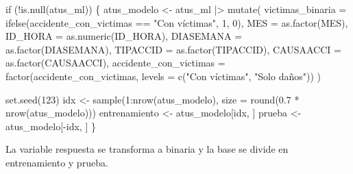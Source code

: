 \documentclass[
  spanish,
  10.5pt,
  letterpaper,
  openany,
  headings=big]{scrbook}
\newenvironment{Shaded}{}{}
\newcommand{\AttributeTok}[1]{\textcolor[rgb]{0.84,0.23,0.29}{#1}}
\newcommand{\ControlFlowTok}[1]{\textcolor[rgb]{0.84,0.23,0.29}{#1}}
\newcommand{\DecValTok}[1]{\textcolor[rgb]{0.00,0.36,0.77}{#1}}
\newcommand{\FloatTok}[1]{\textcolor[rgb]{0.00,0.36,0.77}{#1}}
\newcommand{\FunctionTok}[1]{\textcolor[rgb]{0.44,0.26,0.76}{#1}}
\newcommand{\NormalTok}[1]{\textcolor[rgb]{0.14,0.16,0.18}{#1}}
\newcommand{\OtherTok}[1]{\textcolor[rgb]{0.44,0.26,0.76}{#1}}
\newcommand{\SpecialCharTok}[1]{\textcolor[rgb]{0.00,0.36,0.77}{#1}}
\newcommand{\StringTok}[1]{\textcolor[rgb]{0.01,0.18,0.38}{#1}}
\begin{document}
\begin{Shaded}
\begin{Highlighting}[]
\ControlFlowTok{if}\NormalTok{ (}\SpecialCharTok{!}\FunctionTok{is.null}\NormalTok{(atus\_ml)) \{}
\NormalTok{  atus\_modelo }\OtherTok{\textless{}{-}}\NormalTok{ atus\_ml }\SpecialCharTok{|\textgreater{}}
    \FunctionTok{mutate}\NormalTok{(}
      \AttributeTok{victimas\_binaria =} \FunctionTok{ifelse}\NormalTok{(accidente\_con\_victimas }\SpecialCharTok{==} \StringTok{"Con víctimas"}\NormalTok{, }\DecValTok{1}\NormalTok{, }\DecValTok{0}\NormalTok{),}
      \AttributeTok{MES =} \FunctionTok{as.factor}\NormalTok{(MES),}
      \AttributeTok{ID\_HORA =} \FunctionTok{as.numeric}\NormalTok{(ID\_HORA),}
      \AttributeTok{DIASEMANA =} \FunctionTok{as.factor}\NormalTok{(DIASEMANA),}
      \AttributeTok{TIPACCID =} \FunctionTok{as.factor}\NormalTok{(TIPACCID),}
      \AttributeTok{CAUSAACCI =} \FunctionTok{as.factor}\NormalTok{(CAUSAACCI),}
      \AttributeTok{accidente\_con\_victimas =} \FunctionTok{factor}\NormalTok{(accidente\_con\_victimas, }\AttributeTok{levels =} \FunctionTok{c}\NormalTok{(}\StringTok{"Con víctimas"}\NormalTok{, }\StringTok{"Solo daños"}\NormalTok{))}
\NormalTok{    )}

  \FunctionTok{set.seed}\NormalTok{(}\DecValTok{123}\NormalTok{)}
\NormalTok{  idx }\OtherTok{\textless{}{-}} \FunctionTok{sample}\NormalTok{(}\DecValTok{1}\SpecialCharTok{:}\FunctionTok{nrow}\NormalTok{(atus\_modelo), }\AttributeTok{size =} \FunctionTok{round}\NormalTok{(}\FloatTok{0.7} \SpecialCharTok{*} \FunctionTok{nrow}\NormalTok{(atus\_modelo)))}
\NormalTok{  entrenamiento }\OtherTok{\textless{}{-}}\NormalTok{ atus\_modelo[idx, ]}
\NormalTok{  prueba }\OtherTok{\textless{}{-}}\NormalTok{ atus\_modelo[}\SpecialCharTok{{-}}\NormalTok{idx, ]}
\NormalTok{\}}
\end{Highlighting}
\end{Shaded}

\begin{tcolorbox}[enhanced jigsaw, arc=.35mm, bottomrule=.15mm, bottomtitle=1mm, breakable, colback=white, colbacktitle=quarto-callout-note-color!10!white, colframe=quarto-callout-note-color-frame, coltitle=black, left=2mm, leftrule=.75mm, opacityback=0, opacitybacktitle=0.6, rightrule=.15mm, title=\textcolor{quarto-callout-note-color}{\faInfo}\hspace{0.5em}{Explicación del código}, titlerule=0mm, toprule=.15mm, toptitle=1mm]

La variable respuesta se transforma a binaria y la base se divide en
entrenamiento y prueba.

\end{tcolorbox}
\end{document}
